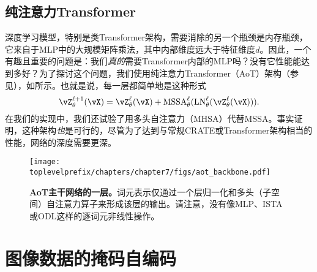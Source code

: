 \documentclass[../../book-main.tex]{subfiles}
\begin{document}
\subsection{纯注意力Transformer} \label{sub:aot_experiments}

深度学习模型，特别是类Transformer架构，需要消除的另一个瓶颈是内存瓶颈，它来自于MLP中的大规模矩阵乘法，其中内部维度远大于特征维度\(d\)。因此，一个有趣且重要的问题是：我们\textit{真的}需要Transformer内部的MLP吗？没有它性能能达到多好？为了探讨这个问题，我们使用纯注意力Transformer（AoT）架构（参见），如所示。也就是说，每一层都简单地是这种形式
\begin{equation}
    \vZ_{\theta}^{\ell + 1}(\vX) = \vZ_{\theta}^{\ell}(\vX) + \MSSA_{\theta}^{\ell}(\LN_{\theta}^{\ell}(\vZ_{\theta}^{\ell}(\vX))).
\end{equation}
在我们的实现中，我们还试验了用多头自注意力（MHSA）代替MSSA。事实证明，这种架构\textit{也}是可行的，尽管为了达到与常规CRATE或Transformer架构相当的性能，网络的深度需要更深。%


\begin{figure}
    \centering 
    \texttt{[image: \\toplevelprefix/chapters/chapter7/figs/aot\_backbone.pdf]}
    \caption{\small\textbf{AoT主干网络的一层。}词元表示仅通过一个层归一化和多头（子空间）自注意力算子来形成该层的输出。请注意，没有像MLP、ISTA或ODL这样的逐词元非线性操作。}
    \label{fig:aot_backbone}
\end{figure}


 

\section{图像数据的掩码自编码}\label{sec:image_completion}
\end{document}
